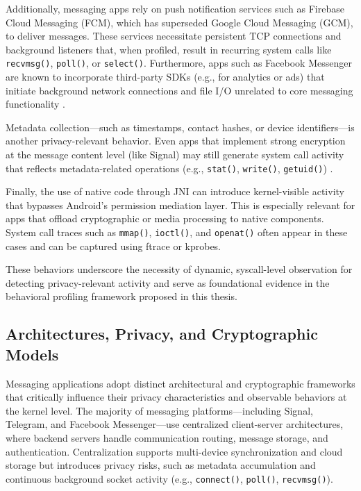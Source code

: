 \documentclass[a4paper,12pt]{report}
\begin{document}
Additionally, messaging apps rely on push notification services such as Firebase Cloud Messaging (FCM), which has superseded Google Cloud Messaging (GCM), to deliver messages. These services necessitate persistent TCP connections and background listeners that, when profiled, result in recurring system calls like \texttt{recvmsg()}, \texttt{poll()}, or \texttt{select()}. Furthermore, apps such as Facebook Messenger are known to incorporate third-party SDKs (e.g., for analytics or ads) that initiate background network connections and file I/O unrelated to core messaging functionality \cite{ShenVervierStringhini2021}.

Metadata collection—such as timestamps, contact hashes, or device identifiers—is another privacy-relevant behavior. Even apps that implement strong encryption at the message content level (like Signal) may still generate system call activity that reflects metadata-related operations (e.g., \texttt{stat()}, \texttt{write()}, \texttt{getuid()}) \cite{arxiv2020metadata}.

Finally, the use of native code through JNI can introduce kernel-visible activity that bypasses Android’s permission mediation layer. This is especially relevant for apps that offload cryptographic or media processing to native components. System call traces such as \texttt{mmap()}, \texttt{ioctl()}, and \texttt{openat()} often appear in these cases and can be captured using ftrace or kprobes.

These behaviors underscore the necessity of dynamic, syscall-level observation for detecting privacy-relevant activity and serve as foundational evidence in the behavioral profiling framework proposed in this thesis.

\subsection{Architectures, Privacy, and Cryptographic Models}
Messaging applications adopt distinct architectural and cryptographic frameworks that critically influence their privacy characteristics and observable behaviors at the kernel level. The majority of messaging platforms—including Signal, Telegram, and Facebook Messenger—use centralized client-server architectures, where backend servers handle communication routing, message storage, and authentication. Centralization supports multi-device synchronization and cloud storage but introduces privacy risks, such as metadata accumulation and continuous background socket activity (e.g., \texttt{connect()}, \texttt{poll()}, \texttt{recvmsg()}).
\end{document}
